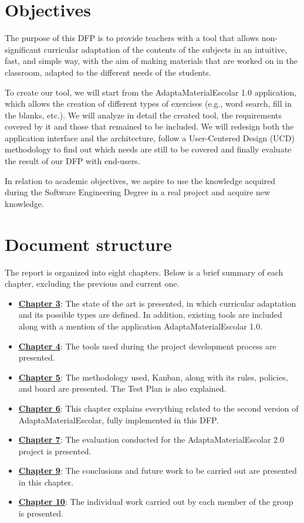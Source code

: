 \section{Objectives}\label{cap:objetives}
The purpose of this DFP is to provide teachers with a tool that allows non-significant curricular adaptation of the contents of the subjects in an intuitive, fast, and simple way, with the aim of making materials that are worked on in the classroom, adapted to the different needs of the students.

To create our tool, we will start from the AdaptaMaterialEscolar 1.0 application, which allows the creation of different types of exercises (e.g., word search, fill in the blanks, etc.). We will analyze in detail the created tool, the requirements covered by it and those that remained to be included. We will redesign both the application interface and the architecture, follow a  User-Centered Design (UCD) methodology to find out which needs are still to be covered and finally evaluate the result of our DFP with end-users.

In relation to academic objectives, we aspire to use the knowledge acquired during the Software Engineering Degree in a real project and acquire new knowledge.

\section{Document structure}\label{cap:Projectstructure}
The report is organized into eight chapters. Below is a brief summary of each chapter, excluding the previous and current one.
\begin{itemize}
    \item \textbf{\hyperref[cap:estadoDelArte]{Chapter 3}}: The state of the art is presented, in which curricular adaptation and its possible types are defined. In addition, existing tools are included along with a mention of the application AdaptaMaterialEscolar 1.0.
    \item \textbf{\hyperref[cap:herramientas]{Chapter 4}}: The tools used during the project development process are presented.
    \item \textbf{\hyperref[cap:metodologia]{Chapter 5}}: The methodology used, Kanban, along with its rules, policies, and board are presented. The Test Plan is also explained.
    \item \textbf{\hyperref[cap:AdaptaMaterialEscolar2.0]{Chapter 6}}: This chapter explains everything related to the second version of AdaptaMaterialEscolar, fully implemented in this DFP.
    \item \textbf{\hyperref[cap:evaluacion]{Chapter 7}}: The evaluation conducted for the AdaptaMaterialEscolar 2.0 project is presented.
    \item \textbf{\hyperref[cap:conclusions]{Chapter 9}}: The conclusions and future work to be carried out are presented in this chapter.
    \item \textbf{\hyperref[cap:TrabajoIndividual]{Chapter 10}}: The individual work carried out by each member of the group is presented.
\end{itemize}